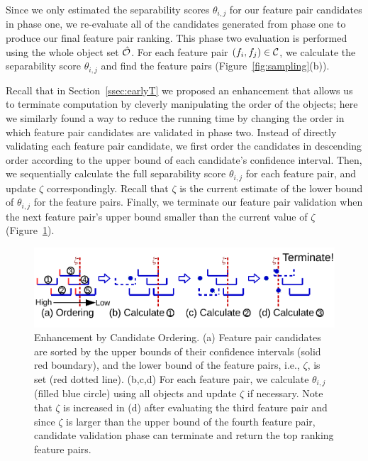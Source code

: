 Since we only estimated the separability scores $\theta_{i,j}$ for our feature pair candidates in phase one, we re-evaluate all of the candidates generated from phase one to produce our final feature pair ranking. This phase two evaluation is performed using the whole object set $\hat{\oo}$.   For each feature pair $(f_i,f_j)\in \cc$, we calculate the separability score $\theta_{i,j}$ and find the \topk feature pairs (Figure~\ref{fig:sampling}(b)).

 Recall that in Section~\ref{ssec:earlyT} we proposed an enhancement that allows us to terminate computation by cleverly manipulating the order of the objects; here we similarly found a way to reduce the running time by changing the order in which feature pair candidates are validated in phase two. Instead of directly validating each feature pair candidate, we first order the candidates in descending order according to the upper bound of each candidate's confidence interval. Then, we sequentially calculate the full separability score $\theta_{i,j}$ for each feature pair, and update $\zeta$ correspondingly. Recall that $\zeta$ is the current estimate of the lower bound of $\theta_{i,j}$ for the \topk feature pairs. Finally, we terminate our feature pair validation when the next feature pair's upper bound smaller than the current value of $\zeta$ (Figure~\ref{fig:candidate_ordering}).

\begin{figure}[h]
 \centering
 \vspace{-10mm}
 \includegraphics[width=\linewidth]{fig/candidate_ordering.pdf}
 \vspace{-8mm}
\caption{Enhancement by Candidate Ordering. (a) Feature pair candidates are sorted by the upper bounds of their confidence intervals (solid red boundary), and the lower bound of the \topthree feature pairs, i.e., $\zeta$, is set (red dotted line). (b,c,d) For each feature pair, we calculate $\theta_{i,j}$ (filled blue circle) using all objects and update $\zeta$ if necessary. Note that $\zeta$ is increased in (d) after evaluating the third feature pair and since $\zeta$ is larger than the upper bound of the fourth feature pair, candidate validation phase can terminate and return the top ranking feature pairs.}
\vspace{-5mm}
\label{fig:candidate_ordering}
\end{figure}

